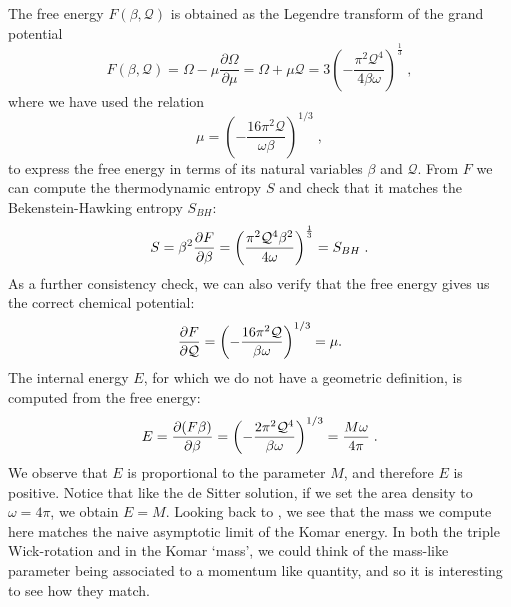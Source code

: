 The free energy $F(\beta, \mathcal{Q})$ is obtained as the  Legendre transform of the grand potential
\begin{equation}
\label{eq:RNfreeenergy1}
    F(\beta,\mathcal{Q}) = \Omega -  \mu \frac{\partial \Omega}{\partial \mu} = 
    \Omega + \mu \mathcal{Q} = 
    3 \left(-\frac{\pi^2 \mathcal{Q}^4}{4 \beta \omega} \right)^{\frac{1}{3}}\;,
\end{equation} 
where we have used the relation 
\begin{equation*}
    \mu = \left(- \frac{16 \pi^2 \mathcal{Q}}{\omega \beta} \right)^{1/3} \;,
\end{equation*}
to express the free energy in terms of its natural variables $\beta$ and $\mathcal{Q}$. 
From $F$ we can compute the thermodynamic entropy $S$ and check that it matches the Bekenstein-Hawking entropy $S_{BH}:$ 
\begin{equation}
\label{eq:entEM}
    S = \beta^2 \frac{\partial F}{\partial \beta} 
    = \left( \frac{\pi^2 \mathcal{Q}^4 \beta^2}{4 \omega} \right)^{\frac{1}{3}}
    = S_{BH}  \;.
\end{equation}
As a further consistency check, we can also verify that the free energy gives us the correct chemical potential:
\begin{equation*}
    \frac{\partial F}{\partial \mathcal{Q}} = \left(- \frac{16 \pi^2 \mathcal{Q}}{\beta \omega} \right)^{1/3} =  \mu.
\end{equation*}
The internal energy $E$, for which we do not have a geometric definition, is computed from the free energy:
\begin{equation*}
E =    \frac{\partial (F \beta)}{\partial \beta} = 
 \left(- \frac{2 \pi^2 \mathcal{Q}^4  }{\beta \omega} \right)^{1/3} = \frac{M\omega}{4\pi} \;.
\end{equation*}
We observe that $E$ is proportional to the parameter $M$, and therefore $E$ is positive. Notice that like the de Sitter solution, if we set the area density to $\omega = 4\pi$, we obtain $E = M$.  Looking back to , we see that the mass we compute here matches the naive asymptotic limit of the Komar energy. In both the triple Wick-rotation and in the Komar `mass', we could think of the mass-like parameter being associated to a momentum like quantity, and so it is interesting to see how they match.

